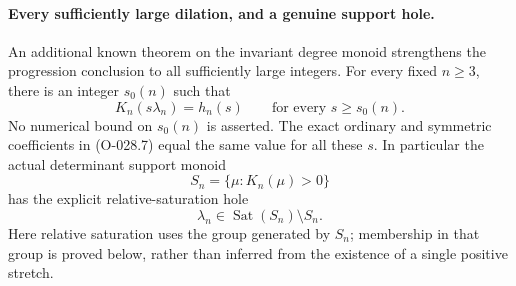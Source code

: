 \paragraph{Every sufficiently large dilation, and a genuine support hole.}
An additional known theorem on the invariant degree monoid
strengthens the progression conclusion to all sufficiently
large integers. For every fixed \(n\geq3\), there is an integer
\(s_0(n)\) such that
\[
                       K_n(s\lambda_n)=h_n(s)
                  \qquad\text{for every }s\geq s_0(n).
                                                               \tag{O-028.11}
\]
No numerical bound on \(s_0(n)\) is asserted.
The exact ordinary and symmetric coefficients in
(O-028.7) equal the same value for all these \(s\).
In particular the actual determinant support monoid
\[
                        S_n=\{\mu:K_n(\mu)>0\}
\]
has the explicit relative-saturation hole
\[
                           \lambda_n\in
                         \operatorname{Sat}(S_n)\setminus S_n.
                                                               \tag{O-028.12}
\]
Here relative saturation uses the group generated by \(S_n\);
membership in that group is proved below, rather than inferred
from the existence of a single positive stretch.

